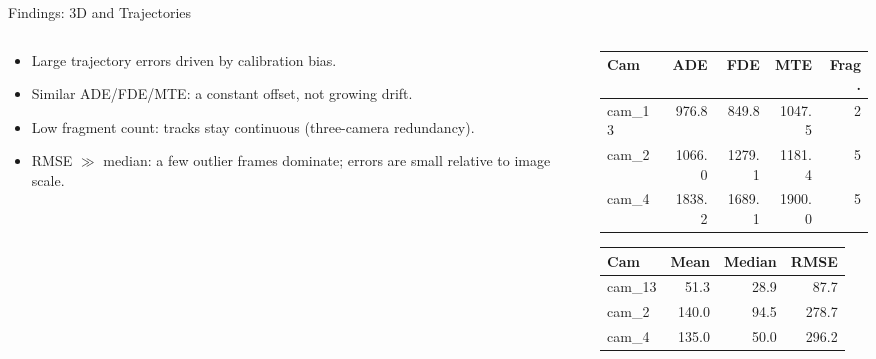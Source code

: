 \begin{frame}{Findings: 3D and Trajectories}
\begin{columns}[T]
  \begin{column}{0.52\textwidth}
    \begin{itemize}
      \item Large trajectory errors driven by calibration bias.
      \item Similar ADE/FDE/MTE: a constant offset, not growing drift.
      \item Low fragment count: tracks stay continuous (three-camera redundancy).
      \item RMSE $\gg$ median: a few outlier frames dominate; errors are small relative to image scale.
    \end{itemize}
  \end{column}
  \begin{column}{0.46\textwidth}
    \centering
    \scriptsize
    \begin{tabular}{lrrrr}
      \toprule
      Cam & ADE & FDE & MTE & Frag. \\
      \midrule
      cam\_13 &  976.8 &  849.8 & 1047.5 & 2 \\
      cam\_2  & 1066.0 & 1279.1 & 1181.4 & 5 \\
      cam\_4  & 1838.2 & 1689.1 & 1900.0 & 5 \\
      \bottomrule
    \end{tabular}

    \vspace{2em}

    \begin{tabular}{lrrr}
      \toprule
      Cam & Mean & Median & RMSE \\
      \midrule
      cam\_13 &  51.3 & 28.9 &  87.7 \\
      cam\_2  & 140.0 & 94.5 & 278.7 \\
      cam\_4  & 135.0 & 50.0 & 296.2 \\
      \bottomrule
    \end{tabular}
  \end{column}
\end{columns}
\end{frame}
